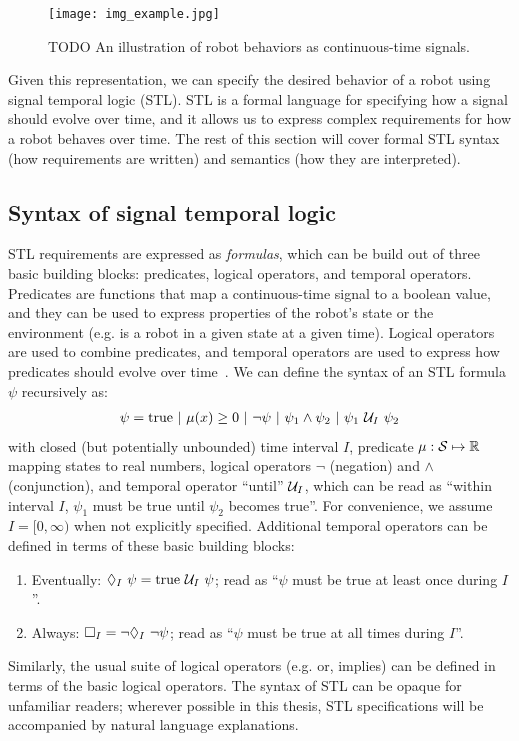 \begin{figure}[t]
    \centering
    \texttt{[image: img\_example.jpg]}
    \caption{TODO An illustration of robot behaviors as continuous-time signals.}
    \label{ch:iros:fig:timed_signal}
\end{figure}

Given this representation, we can specify the desired behavior of a robot using signal temporal logic (STL). STL is a formal language for specifying how a signal should evolve over time, and it allows us to express complex requirements for how a robot behaves over time. The rest of this section will cover formal STL syntax (how requirements are written) and semantics (how they are interpreted).

\subsection{Syntax of signal temporal logic}

STL requirements are expressed as \textit{formulas}, which can be build out of three basic building blocks: predicates, logical operators, and temporal operators. Predicates are functions that map a continuous-time signal to a boolean value, and they can be used to express properties of the robot's state or the environment (e.g. is a robot in a given state at a given time). Logical operators are used to combine predicates, and temporal operators are used to express how predicates should evolve over time~\cite{donzeEfficientRobustMonitoring2013a}. We can define the syntax of an STL formula $\psi$ recursively as:
\begin{align}
    \psi = \text{true}\ |\ \mu(x) \geq 0\ |\ \neg \psi\ |\ \psi_1 \wedge \psi_2\ |\ \psi_1 \ \mathcal{U}_I\ \psi_2\label{ch:iros:stl_syntax}
\end{align}
with closed (but potentially unbounded) time interval $I$, predicate $\mu: \mathcal{S} \mapsto \mathbb{R}$ mapping states to real numbers, logical operators $\neg$ (negation) and $\wedge$ (conjunction), and temporal operator ``until'' $\mathcal{U}_I$, which can be read as ``within interval $I$, $\psi_1$ must be true until $\psi_2$ becomes true''. For convenience, we assume $I = [0, \infty)$ when not explicitly specified. Additional temporal operators can be defined in terms of these basic building blocks:
\begin{enumerate}
    \item Eventually: $\lozenge_I\ \psi = \text{true } \mathcal{U}_I\ \psi$; read as ``$\psi$ must be true at least once during $I$''.
    \item Always: $\square_I = \neg \lozenge_I\ \neg \psi$; read as ``$\psi$ must be true at all times during $I$''.
\end{enumerate}
Similarly, the usual suite of logical operators (e.g. or, implies) can be defined in terms of the basic logical operators. The syntax of STL can be opaque for unfamiliar readers; wherever possible in this thesis, STL specifications will be accompanied by natural language explanations.

